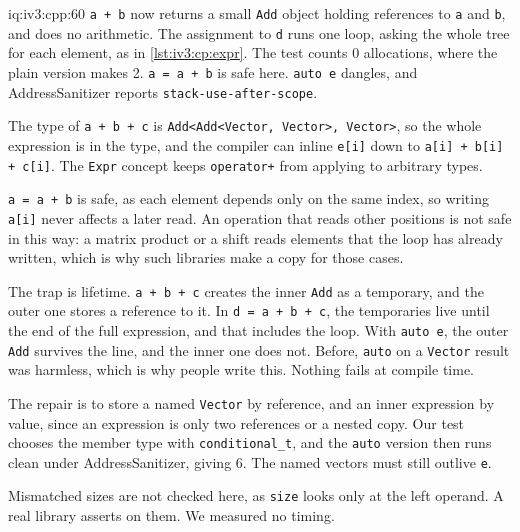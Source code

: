 \begin{solution}{iq:iv3:cpp:60}
\texttt{a + b} now returns a small \texttt{Add} object holding references to \texttt{a} and \texttt{b}, and does no arithmetic. The assignment to \texttt{d} runs one loop, asking the whole tree for each element, as in \cref{lst:iv3:cp:expr}. The test counts 0 allocations, where the plain version makes 2. \texttt{a = a + b} is safe here. \texttt{auto e} dangles, and AddressSanitizer reports \texttt{stack-use-after-scope}.
\label{lst:iv3:cp:expr}

The type of \texttt{a + b + c} is \texttt{Add<Add<Vector, Vector>, Vector>}, so the whole expression is in the type, and the compiler can inline \texttt{e[i]} down to \texttt{a[i] + b[i] + c[i]}. The \texttt{Expr} concept keeps \texttt{operator+} from applying to arbitrary types.

\texttt{a = a + b} is safe, as each element depends only on the same index, so writing \texttt{a[i]} never affects a later read. An operation that reads other positions is not safe in this way: a matrix product or a shift reads elements that the loop has already written, which is why such libraries make a copy for those cases.

The trap is lifetime. \texttt{a + b + c} creates the inner \texttt{Add} as a temporary, and the outer one stores a reference to it. In \texttt{d = a + b + c}, the temporaries live until the end of the full expression, and that includes the loop. With \texttt{auto e}, the outer \texttt{Add} survives the line, and the inner one does not. Before, \texttt{auto} on a \texttt{Vector} result was harmless, which is why people write this. Nothing fails at compile time.

The repair is to store a named \texttt{Vector} by reference, and an inner expression by value, since an expression is only two references or a nested copy. Our test chooses the member type with \texttt{conditional\_t}, and the \texttt{auto} version then runs clean under AddressSanitizer, giving 6. The named vectors must still outlive \texttt{e}.

Mismatched sizes are not checked here, as \texttt{size} looks only at the left operand. A real library asserts on them. We measured no timing.

\end{solution}
